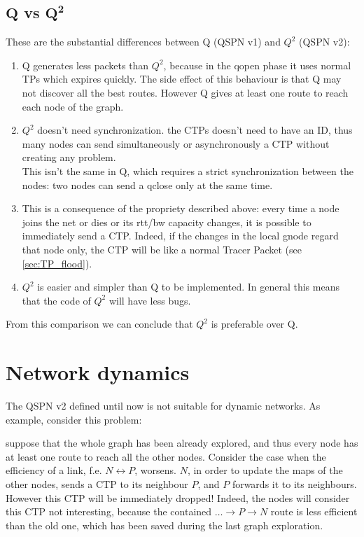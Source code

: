 \documentclass[a4paper]{article}
\begin{document}
\subsection{$\mathbf{Q}$ vs $\mathbf{Q^2}$}
These are the substantial differences between Q (QSPN v1) and $Q^2$ (QSPN v2):
\begin{enumerate}
	\item Q generates less packets than $Q^2$, because in the qopen
		phase it uses normal TPs which expires quickly. The side
		effect of this behaviour is that Q may not discover all
		the best routes. However Q gives at least one route to
		reach each node of the graph.

	\item $Q^2$ doesn't need synchronization. the CTPs doesn't need to
		have an ID, thus many nodes can send simultaneously or
		asynchronously a CTP without creating any problem.\\
		This isn't the same in Q, which requires a strict
		synchronization between the nodes: two nodes can send 
		a qclose only at the same time.
	
	\item This is a consequence of the propriety described above: every
		time a node joins the net or dies or its rtt/bw capacity
		changes, it is possible to immediately send a CTP. Indeed, if
		the changes in the local gnode regard that node only, the CTP
		will be like a normal Tracer Packet (see \ref{sec:TP_flood}).

	\item $Q^2$ is easier and simpler than Q to be implemented. In
		general this means that the code of $Q^2$ will have less
		bugs.
\end{enumerate}

From this comparison we can conclude that $Q^2$ is preferable over Q.

\section{Network dynamics}
\label{sec:netdyn}
The QSPN v2 defined until now is not suitable for dynamic networks. As
example, consider this problem:

suppose that the whole graph has been already explored, and thus every node
has at least one route to reach all the other nodes. Consider the case when
the efficiency of a link, f.e. $N \leftrightarrow P$, worsens.
$N$, in order to update the maps of the other nodes, sends a CTP to its
neighbour $P$, and $P$ forwards it to its neighbours. However this CTP will be
immediately dropped! Indeed, the nodes will consider this CTP not interesting,
because the contained $\dots\rightarrow P \rightarrow N$ route is less
efficient than the old one, which has been saved during the last graph
exploration.
\end{document}
